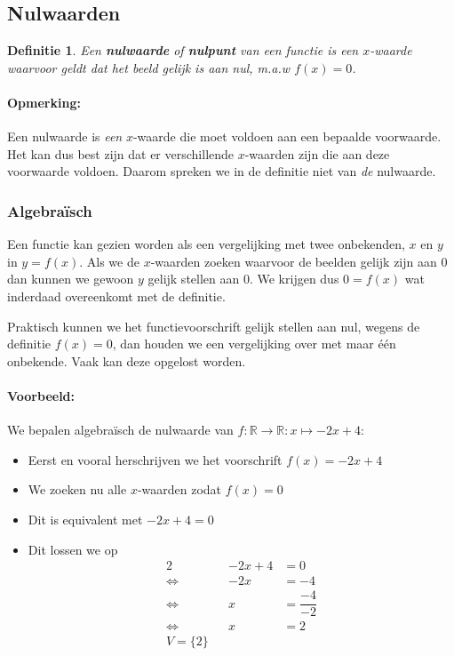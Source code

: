 \documentclass[12pt,twoside]{article}
\newtheorem{definition}{Definitie}
\newcommand{\lra}{\ensuremath{\Leftrightarrow\qquad}}
\begin{document}
\begin{theorie}

\subsection{Nulwaarden}

\begin{definition}
  Een {\bf nulwaarde} of {\bf nulpunt} van een functie is een $x$-waarde waarvoor geldt dat het beeld gelijk is aan nul, m.a.w $f(x)=0$.
\end{definition}

\paragraph*{Opmerking:} Een nulwaarde is {\em een} $x$-waarde die moet voldoen aan een bepaalde voorwaarde. Het kan dus best zijn dat er verschillende $x$-waarden zijn die aan deze voorwaarde voldoen. Daarom spreken we in de definitie niet van {\em de} nulwaarde.

\subsubsection*{Algebraïsch}

Een functie kan gezien worden als een vergelijking met twee onbekenden, $x$ en $y$ in $y=f(x)$. Als we de $x$-waarden zoeken waarvoor de beelden gelijk zijn aan $0$ dan kunnen we gewoon $y$ gelijk stellen aan $0$. We krijgen dus $0=f(x)$ wat inderdaad overeenkomt met de definitie.

Praktisch kunnen we het functievoorschrift gelijk stellen aan nul, wegens de definitie $f(x)=0$, dan houden we een vergelijking over met maar één onbekende. Vaak kan deze opgelost worden.

\paragraph{Voorbeeld:} We bepalen algebraïsch de nulwaarde van $f:\mathbb{R}\to\mathbb{R}:x\mapsto-2x+4$:

\begin{itemize}
\item Eerst en vooral herschrijven we het voorschrift $f(x)=-2x+4$
\item We zoeken nu alle $x$-waarden zodat $f(x)=0$
\item Dit is equivalent met $-2x+4=0$
\item Dit lossen we op
  \begin{alignat*}{2}
    && -2x+4 &= 0\\
    \lra &&   -2x &= -4\\
    \lra &&    x &= \dfrac{-4}{-2}\\
    \lra &&    x &= 2\\
    V=\{2\}
  \end{alignat*}
\end{itemize}


\end{theorie}
\end{document}
